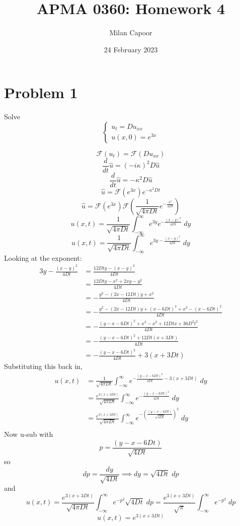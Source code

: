 \documentclass[12pt]{article}
\title{APMA 0360: Homework 4}
\author{Milan Capoor}
\date{24 February 2023}
\renewcommand{\hat}[1]{\widehat{#1}}
\newcommand{\F}[1]{\mathcal{F}(#1)}
\begin{document}
\maketitle
\section*{Problem 1}
Solve 
\[\begin{cases}
    u_t = Du_{xx}\\
    u(x, 0) = e^{3x}
\end{cases}\]

\color{blue}
\[\F{u_t} = \F{Du_{xx}}\]
\[\frac{d}{dt}\hat{u} = (-i\kappa)^2 D \hat{u}\]
\[\frac{d}{dt}\hat{u} = -\kappa^2 D \hat{u}\]
\[\hat{u} = \F{e^{3x}}e^{-\kappa^2Dt}\]
\[\hat{u} = \F{e^{3x}}\F{\frac{1}{\sqrt{4\pi Dt}}e^{-\frac{x^2}{4Dt}}}\]
\[u(x, t) = \frac{1}{\sqrt{4\pi Dt}} \int_{-\infty}^\infty e^{3y} e^{-\frac{(x - y)^2}{4Dt}}\; dy\]
\[u(x, t) = \frac{1}{\sqrt{4\pi Dt}} \int_{-\infty}^\infty e^{3y -\frac{(x - y)^2}{4Dt}}\; dy\]
Looking at the exponent:
\begin{align*}
    3y -\frac{(x - y)^2}{4Dt} &= \frac{12Dty - (x - y)^2}{4Dt}\\
    &= \frac{12Dty - x^2 + 2xy - y^2}{4Dt}\\
    &= -\frac{y^2 - (2x - 12Dt)y + x^2}{4Dt}\\
    &= -\frac{y^2 - (2x - 12Dt)y + (x - 6Dt)^2 + x^2 - (x - 6Dt)^2}{4Dt}\\
    &= -\frac{(y - x - 6Dt)^2 + x^2 - x^2 + 12Dtx + 36D^2t^2}{4Dt}\\
    &= -\frac{(y - x - 6Dt)^2 + 12Dt(x +3Dt)}{4Dt}\\
    &= -\frac{(y-x-6Dt)^2}{4Dt} + 3(x + 3Dt)
\end{align*}
Substituting this back in, 
\begin{align*}
    u(x, t) &= \frac{1}{\sqrt{4\pi Dt}} \int_{-\infty}^\infty e^{-\frac{(y-x-6Dt)^2}{4Dt} - 3(x + 3Dt)}\; dy\\
    &= \frac{e^{3(x + 3Dt)}}{\sqrt{4\pi Dt}} \int_{-\infty}^\infty e^{-\frac{(y-x-6Dt)^2}{4Dt}}\; dy\\
    &= \frac{e^{3(x + 3Dt)}}{\sqrt{4\pi Dt}} \int_{-\infty}^\infty e^{-\left(\frac{(y-x-6Dt)}{\sqrt{4Dt}}\right)^2}\; dy\\
\end{align*}
Now u-sub with 
\[p = \frac{(y-x-6Dt)}{\sqrt{4Dt}}\]
so 
\[dp = \frac{dy}{\sqrt{4Dt}} \implies dy = \sqrt{4Dt} \; dp\]
and 
\[u(x, t) = \frac{e^{3(x + 3Dt)}}{\sqrt{4\pi Dt}} \int_{-\infty}^\infty e^{-p^2} \sqrt{4Dt} \; dp = \frac{e^{3(x + 3Dt)}}{\sqrt{\pi}} \int_{-\infty}^\infty e^{-p^2}\; dp\]
\[\boxed{u(x, t) = e^{3(x + 3Dt)}}\]
\end{document}
